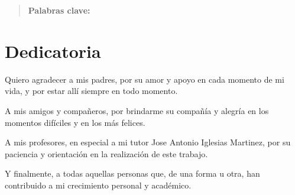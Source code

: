 \documentclass[12pt]{report} %
\begin{document}
\newpage %
\thispagestyle{empty}
\mbox{}

\renewcommand\abstractname{\large\bfseries\filcenter\uppercase{Resumen}}
\begin{abstract}
\thispagestyle{plain}
\setcounter{page}{3}
	
	
	\textbf{Palabras clave:}
	
	\vfill
\end{abstract}
	\newpage %
	\thispagestyle{empty}
	\mbox{}


\chapter*{Dedicatoria} %

\setcounter{page}{5}
	

	Quiero agradecer a mis padres, por su amor y apoyo en cada momento de mi vida, y por estar allí siempre en todo momento. 
	
	A mis amigos y compañeros, por brindarme su compañía y alegría en los momentos difíciles y en los más felices.
	
	A mis profesores, en especial a mi tutor Jose Antonio Iglesias Martinez, por su paciencia y orientación en la realización de este trabajo. 
	
	Y finalmente, a todas aquellas personas que, de una forma u otra, han contribuido a mi crecimiento personal y académico. 

		
	\vfill
	
	\newpage %
	\thispagestyle{empty}
	\mbox{}
	


\tableofcontents
\thispagestyle{fancy}

\newpage %
\thispagestyle{empty}
\mbox{}

\listoffigures
\thispagestyle{fancy}
\end{document}
